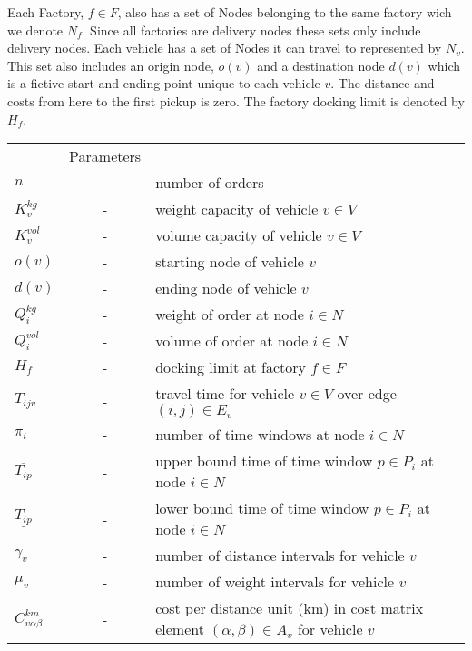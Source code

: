 \documentclass[a4paper,10pt]{article}
\begin{document}
Each Factory, $f \in F$, also has a set of Nodes belonging to the same factory wich we denote $N_f$. Since all factories are delivery nodes these sets only include delivery nodes.
Each vehicle has a set of Nodes it can travel to represented by $N_v$.
This set also includes an origin node, $o(v)$ and a destination node $d(v)$ which is a fictive start and ending point unique to each vehicle $v$. 
The distance and costs from here to the first pickup is zero.
The factory docking limit is denoted by $H_f$. 
\begin{tabular}{l c l }
    			        &Parameters 							\\ 
    $n    	            $   &-& number of orders     					\\
    $K_v^{kg}  	            $   &-& weight capacity of vehicle $v\in V$	 			\\
    $K_v^{vol} 	            $   &-& volume capacity of vehicle $v\in V$	 			\\
    $o(v)                   $   &-& starting node of vehicle $v$                                \\
    $d(v)                   $   &-& ending node of vehicle $v$                                  \\
    $Q_i^{kg}  	            $	&-& weight of order at node $i\in N$				\\
    $Q_i^{vol} 	            $	&-& volume of order at node $i\in N$				\\
    $H_f  	            $	&-& docking limit at factory $f\in F$				\\
    $T_{ijv}                $ 	&-& travel time for vehicle $v\in V$ over edge $(i,j)\in E_v$	\\
    $\pi_i	            $	&-& number of time windows at node $i\in N$			\\ 
    $\overline{T_{ip}}      $   &-& upper bound time of time window $p\in P_i$ at node $i\in N$ \\
    $\underline{T_{ip}}     $	&-& lower bound time of time window $p\in P_i$ at node $i\in N$ \\
    $\gamma_v               $   &-& number of distance intervals for vehicle $v$                \\
    $\mu_v                  $   &-& number of weight intervals for vehicle $v$                  \\                   
    $C^{km}_{v\alpha\beta}  $	&-& cost per distance unit (km) in cost matrix element 
                                    $(\alpha, \beta) \in A_v$ for vehicle $v$	                \\

\end{tabular}
\end{document}
